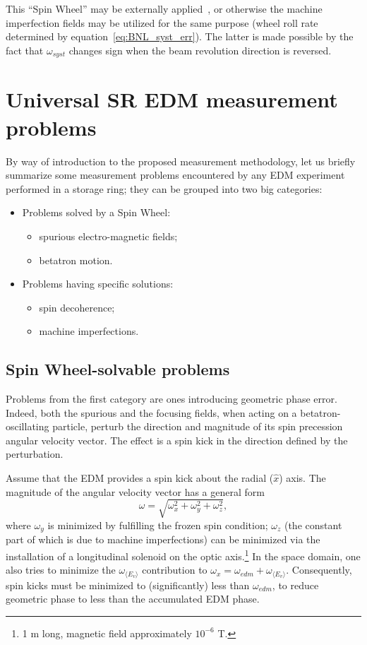 \documentclass[a4paper]{jacow}
\newcommand{\w}{\omega}
\newcommand{\avg}[1]{\langle{#1}\rangle}
\newcommand{\wedm}{\w_{edm}}
\newcommand{\wimp}{\w_{\avg{E_v}}}
\begin{document}
This ``Spin Wheel'' may be externally applied~\cite{Koop:SW}, or otherwise the machine imperfection fields
may be utilized for the same purpose (wheel roll rate determined by equation~\eqref{eq:BNL_syst_err}).
The latter is made possible by the fact that $\w_{syst}$ changes sign when the beam revolution direction
is reversed.~\cite[p.~11]{BNL:Deuteron2008}

\section{Universal SR EDM measurement problems}

By way of introduction to the proposed measurement methodology, let us briefly summarize some measurement problems
encountered by any EDM experiment performed in a storage ring; they can be grouped into two big categories:
\begin{itemize}
\item Problems solved by a Spin Wheel:
  \begin{itemize}
  \item spurious electro-magnetic fields;
  \item betatron motion.
  \end{itemize}
\item Problems having specific solutions:
  \begin{itemize}
  \item spin decoherence;
  \item machine imperfections.
  \end{itemize}
\end{itemize}

\subsection{Spin Wheel-solvable problems}
Problems from the first category are ones introducing geometric phase error. Indeed, both the spurious 
and the focusing fields, when acting on a betatron-oscillating particle, perturb the direction and
magnitude of its spin precession angular velocity vector. The effect is a spin kick in the direction defined
by the perturbation.

Assume that the EDM provides a spin kick about the radial ($\hat x$) axis. The magnitude of the angular
velocity vector has a general form
\[
\w = \sqrt{\w_x^2 + \w_y^2 + \w_z^2},
\]
where $\w_y$ is minimized by fulfilling the frozen spin condition; $\w_z$ (the constant part of which is
due to machine imperfections) can be minimized via the installation
of a longitudinal solenoid on the optic axis.\footnote{1 m long, magnetic field approximately $10^{-6}$ T.} In the
space domain, one also tries to minimize the $\wimp$ contribution to $\w_x = \wedm + \wimp$. Consequently,
spin kicks must be minimized to (significantly) less than $\wedm$, to reduce geometric phase to
less than the accumulated EDM phase.
\end{document}
